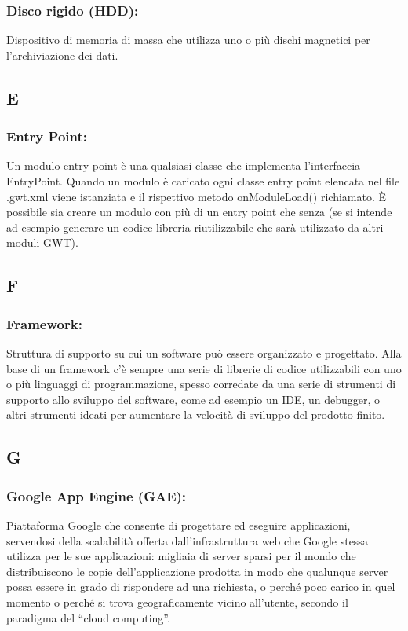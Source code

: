 \subsubsection*{Disco rigido (HDD):} Dispositivo di memoria di massa che
utilizza uno o pi\`u dischi magnetici per l'archiviazione dei dati.

\subsection*{\huge{E}}

\subsubsection*{Entry Point:}
Un modulo entry point \`e una qualsiasi classe che implementa l'interfaccia
EntryPoint. Quando un modulo \`e caricato ogni classe entry point elencata nel
file .gwt.xml viene istanziata e il rispettivo metodo onModuleLoad() richiamato.
\`E possibile sia creare un modulo con pi\`u di un entry point che senza (se si
intende ad esempio generare un codice libreria riutilizzabile che sar\`a
utilizzato da altri moduli GWT).

\subsection*{\huge{F}}
\subsubsection*{Framework:}  Struttura di supporto su cui un software pu\`o
essere organizzato e progettato. Alla base di un framework c'\`e sempre una
serie di librerie di codice utilizzabili con uno o pi\`u linguaggi di
programmazione, spesso corredate da una serie di strumenti di supporto allo
sviluppo del software, come ad esempio un IDE, un debugger, o altri strumenti
ideati per aumentare la velocit\`a di sviluppo del prodotto finito.

\subsection*{\huge{G}}

\subsubsection*{Google App Engine (GAE):} Piattaforma Google che consente di
progettare ed eseguire applicazioni, servendosi della scalabilit\`a offerta
dall'infrastruttura web che Google stessa utilizza per le sue applicazioni:
migliaia di server sparsi per il mondo che distribuiscono le copie
dell'applicazione prodotta in modo che qualunque server possa essere in grado di
rispondere ad una richiesta, o perch\'e poco carico in quel momento o perch\'e
si trova geograficamente vicino all'utente, secondo il paradigma del ``cloud computing''.

